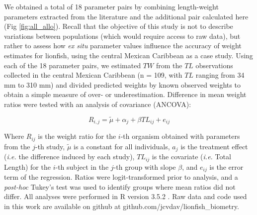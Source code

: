 \documentclass[fleqn,10pt,lineno]{wlpeerj} %
\begin{document}
We obtained a total of 18 parameter pairs by combining length-weight
parameters extracted from the literature and the additional pair
calculated here (Fig \ref{fig:all_allo}). Recall that the objective of
this study is not to describe variations between populations (which
would require access to raw data), but rather to assess how \emph{ex
situ} parameter values influence the accuracy of weight estimates for
lionfish, using the central Mexican Caribbean as a case study. Using
each of the 18 parameter pairs, we estimated \(TW\) from the \(TL\)
observations collected in the central Mexican Caribbean (n = 109, with
\(TL\) ranging from 34 mm to 310 mm) and divided predicted weights by
known observed weights to obtain a simple measure of over- or
underestimation. Difference in mean weight ratios were tested with an
analysis of covariance (ANCOVA):

\begin{equation}
R_{i,j} = \tilde{\mu} + \alpha_j + \beta TL_{ij} + e_{ij}
\end{equation}

\clearpage

Where \(R_{ij}\) is the weight ratio for the \(i\)-th organism obtained
with parameters from the \(j\)-th study, \(\tilde{\mu}\) is a constant
for all individuals, \(a_j\) is the treatment effect (\emph{i.e.} the
difference induced by each study), \(TL_{ij}\) is the covariate
(\emph{i.e.} Total Length) for the \(i\)-th subject in the \(j\)-th
group with slope \(\beta\), and \(e_{ij}\) is the error term of the
regression. Ratios were logit-transformed prior to analysis, and a
\emph{post-hoc} Tukey's test was used to identify groups where mean
ratios did not differ. All analyses were performed in R version 3.5.2
\citep{rcore_2018}. Raw data and code used in this work are available on
github at github.com/jcvdav/lionfish\_biometry.
\end{document}
